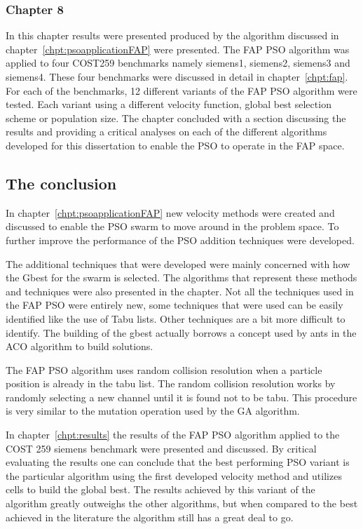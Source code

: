 \subsubsection{Chapter 8}
In this chapter results were presented produced by the algorithm discussed in chapter~\ref{chpt:psoapplicationFAP} were presented. The FAP PSO algorithm was applied to four COST259 benchmarks namely siemens1, siemens2, siemens3 and siemens4. These four benchmarks were discussed in detail in chapter~\ref{chpt:fap}. For each of the benchmarks, 12 different variants of the FAP PSO algorithm were tested. Each variant using a different velocity function, global best selection scheme or population size. The chapter concluded with a section discussing the results and providing a critical analyses on each of the different algorithms developed for this dissertation to enable the PSO to operate in the FAP space.
\subsection{The conclusion}
In chapter~\ref{chpt:psoapplicationFAP} new velocity methods were created and discussed to enable the PSO swarm to move around in the problem space. To further improve the performance of the PSO addition techniques were developed.

The additional techniques that were developed were mainly concerned with how the Gbest for the swarm is selected. The algorithms that represent these methods and techniques were also presented in the chapter. Not all the techniques used in the FAP PSO were entirely new, some techniques that were used can be easily identified like the use of Tabu lists. Other techniques are a bit more difficult to identify. The building of the gbest actually borrows a concept used by ants in the ACO algorithm to build solutions. 

The FAP PSO algorithm uses random collision resolution when a particle position is already in the tabu list. The random collision resolution works by randomly selecting a new channel until it is found not to be tabu. This procedure is very similar to the mutation operation used by the GA algorithm.

In chapter~\ref{chpt:results} the results of the FAP PSO algorithm applied to the COST 259 siemens benchmark were presented and discussed. By critical evaluating the results one can conclude that the best performing PSO variant is the particular algorithm using the first developed velocity method and utilizes cells to build the global best. The results achieved by this variant of the algorithm greatly outweighs the other algorithms, but when compared to the best achieved in the literature the algorithm still has a great deal to go.

